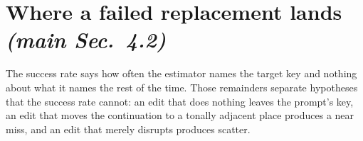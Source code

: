 \documentclass{article}
\begin{document}
\section{Where a failed replacement lands \normalfont\textit{(main Sec.~4.2)}}
\label{sec:landing}
%

The success rate says how often the estimator names the target key and nothing about
what it names the rest of the time. Those remainders separate hypotheses that the success
rate cannot: an edit that does nothing leaves the prompt's key, an edit that moves the
continuation to a tonally adjacent place produces a near miss, and an edit that merely
disrupts produces scatter.
\end{document}
